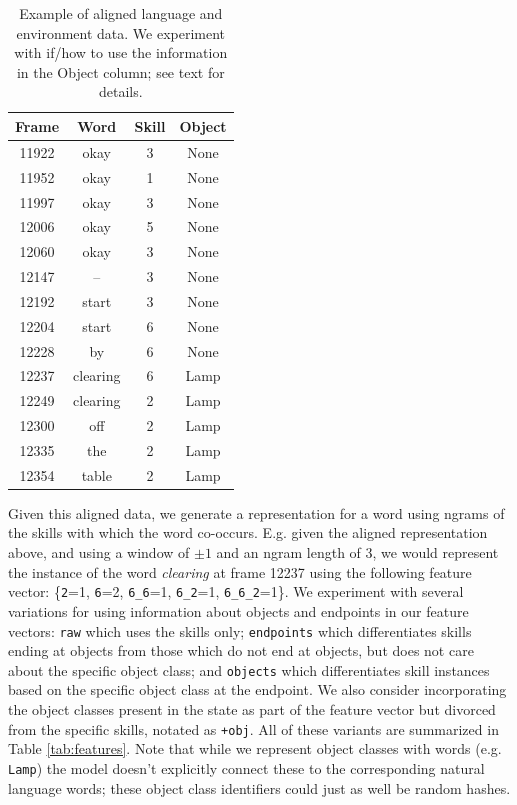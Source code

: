 \documentclass[11pt]{article}
\begin{document}
\begin{table}[ht!]
\centering
\begin{tabular}{|cccc|}
\hline
Frame & Word & Skill & Object  \\\hline
11922   & okay  &  3 &      None\\
11952   & okay   & 1  &     None\\
11997   & okay  &  3   &    None\\
12006   & okay  &  5   &    None\\
12060   & okay  &  3   &    None\\
12147   & --      &3   &    None\\
12192   & start   &3     &  None\\
12204   & start   &6     &  None\\
12228   & by      &6     &  None\\
12237   & clearing    &    6    &   Lamp\\
12249   &clearing  &      2    &   Lamp\\
12300   &off     &2      & Lamp\\
12335   &the     &2      & Lamp\\
12354   &table  & 2     &  Lamp\\
\hline
\end{tabular}
\caption{Example of aligned language and environment data. We experiment with if/how to use the information in the Object column; see text for details.} %
\label{tab:aligned}
\end{table}

Given this aligned data, we generate a representation for a word using ngrams of the skills with which the word co-occurs. E.g. given the aligned representation above, and using a window of $\pm1$ and an ngram length of 3, we would represent the instance of the word \textit{clearing} at frame 12237 using the following feature vector: \{\texttt{2}=1, \texttt{6}=2, \texttt{6\_6}=1, \texttt{6\_2}=1, \texttt{6\_6\_2}=1\}. We experiment with several variations for using information about objects and endpoints in our feature vectors: \texttt{raw} which uses the skills only; \texttt{endpoints} which differentiates skills ending at objects from those which do not end at objects, but does not care about the specific object class; and \texttt{objects} which differentiates skill instances based on the specific object class at the endpoint. We also consider incorporating the object classes present in the state as part of the feature vector but divorced from the specific skills, notated as \texttt{+obj}. All of these variants are summarized in Table \ref{tab:features}. Note that while we represent object classes with words (e.g. \texttt{Lamp}) the model doesn't explicitly connect these to the corresponding natural language words; these object class identifiers could just as well be random hashes. 
\end{document}
